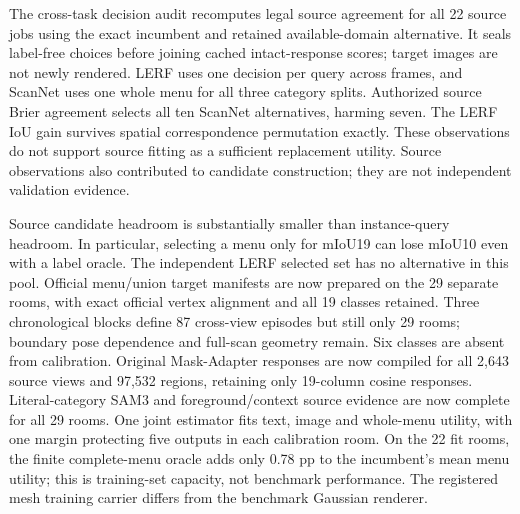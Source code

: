 \documentclass[10pt]{article}
\begin{document}
The cross-task decision audit recomputes legal source agreement for all 22
source jobs using the exact incumbent and retained available-domain alternative.
It seals label-free choices before joining cached intact-response scores;
target images are not newly rendered. LERF uses one decision per query across
frames, and ScanNet uses one whole menu for all three category splits. Authorized
source Brier agreement selects all ten ScanNet alternatives, harming seven.
The LERF IoU gain survives spatial correspondence permutation exactly. These
observations do not support source fitting as a sufficient replacement utility.
Source observations also contributed to candidate construction; they are not
independent validation evidence.

\begin{table}[ht]
\centering\small
\resizebox{\linewidth}{!}{}
\caption{Cross-task attribution using retained complete-answer metrics. The
historical pool contains nine conditions from the earlier four studies. Oracles
use labels for diagnosis only. The pool oracle chooses by query IoU or complete
menu mIoU19; all other metrics use that SAME answer. The joint oracle additionally
requires no harm to any reported metric within each decision unit. Neither is a
method result or an assertion that these gains are attainable by one policy.}
\end{table}

Source candidate headroom is substantially smaller than instance-query headroom.
In particular, selecting a menu only for mIoU19 can lose mIoU10 even with a label
oracle. The independent LERF selected set has no alternative in this pool.
Official menu/union target manifests are now prepared on the 29 separate rooms,
with exact official vertex alignment and all 19 classes retained. Three
chronological blocks define 87 cross-view episodes but still only 29 rooms;
boundary pose dependence and full-scan geometry remain. Six classes are absent
from calibration. Original Mask-Adapter responses are now compiled for all
2,643 source views and 97,532 regions, retaining only 19-column cosine responses.
Literal-category SAM3 and foreground/context source evidence are now complete
for all 29 rooms. One joint estimator fits text, image and whole-menu utility,
with one margin protecting five outputs in each calibration room. On the 22 fit
rooms, the finite complete-menu oracle adds only 0.78 pp to the incumbent's mean
menu utility; this is training-set capacity, not benchmark performance. The
registered mesh training carrier differs from the benchmark Gaussian renderer.
\end{document}
